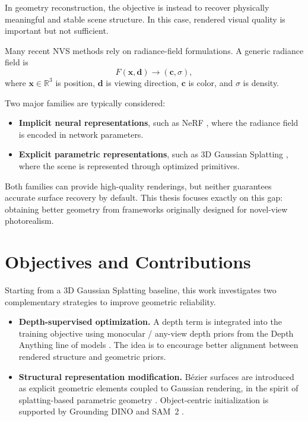 \documentclass{report}
\begin{document}
In geometry reconstruction, the objective is instead to recover physically meaningful and stable scene structure. In this case, rendered visual quality is important but not sufficient.

Many recent NVS methods rely on radiance-field formulations. A generic radiance field is
\[
F(\mathbf{x}, \mathbf{d}) \rightarrow (\mathbf{c}, \sigma),
\]
where $\mathbf{x}\in\mathbb{R}^3$ is position, $\mathbf{d}$ is viewing direction, $\mathbf{c}$ is color, and $\sigma$ is density.

Two major families are typically considered:
\begin{itemize}
    \item \textbf{Implicit neural representations}, such as NeRF \cite{mildenhall2020nerf}, where the radiance field is encoded in network parameters.
    \item \textbf{Explicit parametric representations}, such as 3D Gaussian Splatting \cite{kerbl2023gaussian}, where the scene is represented through optimized primitives.
\end{itemize}

Both families can provide high-quality renderings, but neither guarantees accurate surface recovery by default. This thesis focuses exactly on this gap: obtaining better geometry from frameworks originally designed for novel-view photorealism.

\section{Objectives and Contributions}
Starting from a 3D Gaussian Splatting baseline, this work investigates two complementary strategies to improve geometric reliability.
\begin{itemize}
    \item \textbf{Depth-supervised optimization.} A depth term is integrated into the training objective using monocular / any-view depth priors from the Depth Anything line of models \cite{yang2024depth,yang2024depthanythingv2,lin2025depthanything3}. The idea is to encourage better alignment between rendered structure and geometric priors.
    \item \textbf{Structural representation modification.} B\'ezier surfaces are introduced as explicit geometric elements coupled to Gaussian rendering, in the spirit of splatting-based parametric geometry \cite{liu2025bezier,kerbl2023gaussian}. Object-centric initialization is supported by Grounding DINO \cite{liu2023groundingdino} and SAM~2 \cite{ravi2024sam2}.
\end{itemize}
\end{document}
